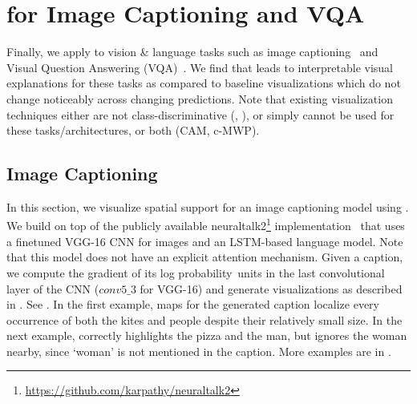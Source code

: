\begin{figure}[h]
\begin{center}
\begin{subfigure}[t]{\columnwidth}
\end{subfigure}
\caption{}
\label{fig:captioning_word}
\end{center}
\end{figure}

\vspace{-10pt}
\section{\gcam{} for Image Captioning and VQA}
Finally, we apply \gcam{} to vision \& language tasks such as image captioning~\cite{chen2015microsoft,johnson_cvpr16,vinyals_cvpr15}
and Visual Question Answering (VQA)~\cite{antol2015vqa,gao2015you,malinowski_iccv15,ren_nips15}.
We find that \gcam{} leads to interpretable visual explanations for these tasks
as compared to baseline visualizations which do not change noticeably across changing predictions.
Note that existing visualization techniques either are not class-discriminative
(\gb{}, \dec{}), or simply cannot be used for these tasks/architectures,
or both (CAM, c-MWP).

\vspace{-10pt}
\subsection{Image Captioning}\label{sec:nic}

  In this section, we visualize spatial support for an image captioning model using \gcam{}.
  We build \gcam{} on top of the publicly available neuraltalk2\footnote{\url{https://github.com/karpathy/neuraltalk2}} implementation~\cite{karpathy2015deep} that uses a finetuned VGG-16 CNN for images and an LSTM-based language model. Note that this model does not have an explicit attention mechanism.
  Given a caption, we compute the gradient of its log probability~\wrt units in the last convolutional layer of the CNN ($conv5\_3$ for VGG-16) and generate \gcam{} visualizations as described in .
See .
In the first example, \gcam{} maps for the generated caption localize
every occurrence of both the kites and people despite their relatively small size.
In the next example, \gcam{} correctly highlights the pizza and the man, but ignores the woman nearby, since `woman' is not mentioned in the caption. More examples are in .%

